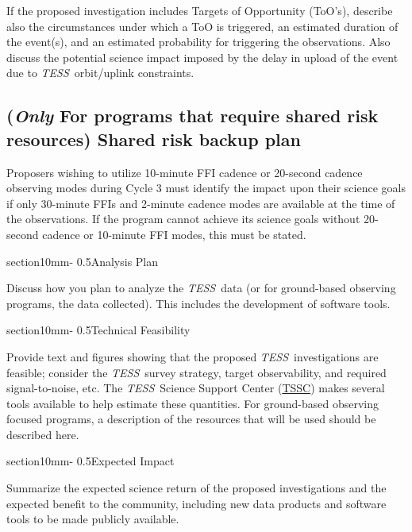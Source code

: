 \documentclass[letterpaper,11pt]{article}
\makeatletter
\renewcommand{\section}{\@startsection%
{section}{1}{0mm}{-\baselineskip}%
{0.5\baselineskip}{\normalfont\Large\bfseries}}%
\newcommand{\tess}{{\it TESS}}
\makeatother
\begin{document}
If the proposed investigation includes Targets of Opportunity (ToO's), describe also the circumstances 
under which a ToO is triggered, an estimated duration of the event(s), and an estimated probability for 
triggering the observations. Also discuss the potential science impact imposed by the delay in upload 
of the event due to \tess\ orbit/uplink constraints.

\subsection{({\it Only} For programs that require shared risk resources) Shared risk backup plan}

Proposers wishing to utilize 10-minute FFI cadence or 20-second cadence observing modes during Cycle 3 must identify the impact upon their science goals if only 30-minute FFIs and 2-minute cadence modes are available at the time of the observations. If the program cannot achieve its science goals without 20-second cadence or 10-minute FFI modes, this must be stated.

\section{Analysis Plan}

Discuss how you plan to analyze the \tess\ data (or for ground-based observing programs, the data collected). This includes the development of software tools.


\section{Technical Feasibility}

Provide text and figures showing that the proposed \tess\ investigations are feasible; consider the 
\tess\ survey strategy, target observability, and required signal-to-noise, etc. The \tess\ Science 
Support Center (\href{https://heasarc.gsfc.nasa.gov/docs/tess/}{TSSC}) makes several tools available to help estimate these quantities. For ground-based observing focused programs, a description of the resources that will be used should be described here.


\section{Expected Impact}

Summarize the expected science return of the proposed investigations and the expected benefit 
to the community, including new data products and software tools to be made publicly available.
\end{document}
